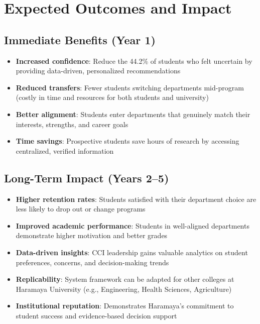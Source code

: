 \documentclass[12pt, a4paper]{article}
\begin{document}
\section{Expected Outcomes and Impact}

\subsection{Immediate Benefits (Year 1)}
\begin{itemize}[leftmargin=1.5em, itemsep=3pt]
\item \textbf{Increased confidence}: Reduce the 44.2\% of students who felt uncertain by providing data-driven, personalized recommendations
\item \textbf{Reduced transfers}: Fewer students switching departments mid-program (costly in time and resources for both students and university)
\item \textbf{Better alignment}: Students enter departments that genuinely match their interests, strengths, and career goals
\item \textbf{Time savings}: Prospective students save hours of research by accessing centralized, verified information
\end{itemize}

\subsection{Long-Term Impact (Years 2–5)}
\begin{itemize}[leftmargin=1.5em, itemsep=3pt]
\item \textbf{Higher retention rates}: Students satisfied with their department choice are less likely to drop out or change programs
\item \textbf{Improved academic performance}: Students in well-aligned departments demonstrate higher motivation and better grades
\item \textbf{Data-driven insights}: CCI leadership gains valuable analytics on student preferences, concerns, and decision-making trends
\item \textbf{Replicability}: System framework can be adapted for other colleges at Haramaya University (e.g., Engineering, Health Sciences, Agriculture)
\item \textbf{Institutional reputation}: Demonstrates Haramaya's commitment to student success and evidence-based decision support
\end{itemize}
\end{document}
